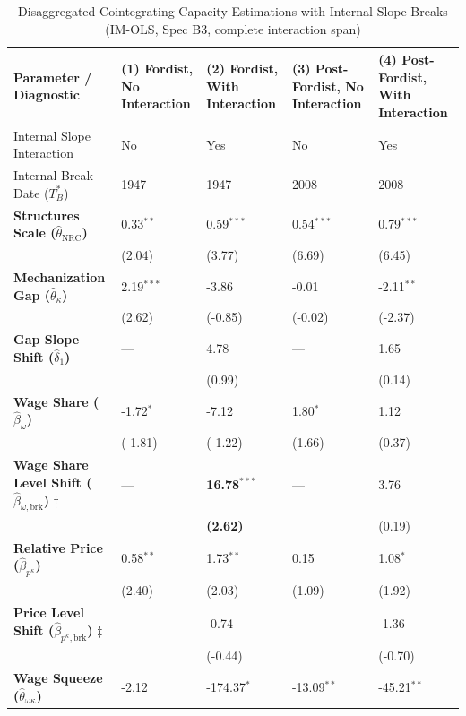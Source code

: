 \documentclass[11pt,a4paper]{article}
\begin{document}
\begin{table}[H]
\centering
\caption{Disaggregated Cointegrating Capacity Estimations with Internal Slope Breaks (IM-OLS, Spec B3, complete interaction span)}
\label{tab:specB_table_3_2}
\small
\begin{tabular}{p{5.5cm}p{2.5cm}p{2.5cm}p{2.5cm}p{2.5cm}}
\toprule
Parameter / Diagnostic & (1) Fordist, No Interaction & (2) Fordist, With Interaction & (3) Post-Fordist, No Interaction & (4) Post-Fordist, With Interaction \\
\midrule
Internal Slope Interaction & No & Yes & No & Yes \\
Internal Break Date ($T_B^*$) & 1947 & 1947 & 2008 & 2008 \\
\midrule
\textbf{Structures Scale ($\hat{\theta}_{\text{NRC}}$)} & 0.33$^{**}$ & 0.59$^{***}$ & 0.54$^{***}$ & 0.79$^{***}$ \\
 & {\scriptsize (2.04)} & {\scriptsize (3.77)} & {\scriptsize (6.69)} & {\scriptsize (6.45)} \\
\textbf{Mechanization Gap ($\hat{\theta}_{\kappa}$)} & 2.19$^{***}$ & -3.86 & -0.01 & -2.11$^{**}$ \\
 & {\scriptsize (2.62)} & {\scriptsize (-0.85)} & {\scriptsize (-0.02)} & {\scriptsize (-2.37)} \\
\textbf{Gap Slope Shift ($\hat{\delta}_1$)} & --- & 4.78 & --- & 1.65 \\
 & & {\scriptsize (0.99)} & & {\scriptsize (0.14)} \\
\textbf{Wage Share ($\hat{\beta}_{\omega}$)} & -1.72$^{*}$ & -7.12 & 1.80$^{*}$ & 1.12 \\
 & {\scriptsize (-1.81)} & {\scriptsize (-1.22)} & {\scriptsize (1.66)} & {\scriptsize (0.37)} \\
\textbf{Wage Share Level Shift ($\hat{\beta}_{\omega, \text{brk}}$)} $\ddagger$ & --- & \textbf{16.78}$^{***}$ & --- & 3.76 \\
 & & {\scriptsize \textbf{(2.62)}} & & {\scriptsize (0.19)} \\
\textbf{Relative Price ($\hat{\beta}_{p^{\kappa}}$)} & 0.58$^{**}$ & 1.73$^{**}$ & 0.15 & 1.08$^{*}$ \\
 & {\scriptsize (2.40)} & {\scriptsize (2.03)} & {\scriptsize (1.09)} & {\scriptsize (1.92)} \\
\textbf{Price Level Shift ($\hat{\beta}_{p^{\kappa}, \text{brk}}$)} $\ddagger$ & --- & -0.74 & --- & -1.36 \\
 & & {\scriptsize (-0.44)} & & {\scriptsize (-0.70)} \\
\textbf{Wage Squeeze ($\hat{\theta}_{\omega \kappa}$)} & -2.12 & -174.37$^{*}$ & -13.09$^{**}$ & -45.21$^{**}$ \\

\end{tabular}
\end{table}
\end{document}
